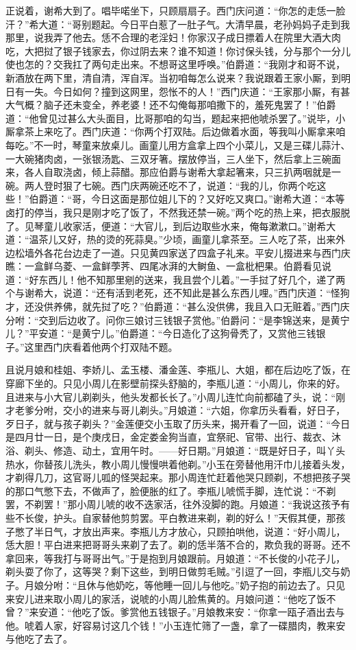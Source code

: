 正说着，谢希大到了。唱毕喏坐下，只顾扇扇子。西门庆问道：“你怎的走恁一脸汗？”希大道：“哥别题起。今日平白惹了一肚子气。大清早晨，老孙妈妈子走到我那里，说我弄了他去。恁不合理的老淫妇！你家汉子成日摽着人在院里大酒大肉吃，大把挝了银子钱家去，你过阴去来？谁不知道！你讨保头钱，分与那个一分儿使也怎的？交我扛了两句走出来。不想哥这里呼唤。”伯爵道：“我刚才和哥不说，新酒放在两下里，清自清，浑自浑。当初咱每怎么说来？我说跟着王家小厮，到明日有一失。今日如何？撞到这网里，怨怅不的人！”西门庆道：“王家那小厮，有甚大气概？脑子还未变全，养老婆！还不勾俺每那咱撒下的，羞死鬼罢了！”伯爵道：“他曾见过甚么大头面目，比哥那咱的勾当，题起来把他唬杀罢了。”说毕，小厮拿茶上来吃了。西门庆道：“你两个打双陆。后边做着水面，等我叫小厮拿来咱每吃。”不一时，琴童来放桌儿。画童儿用方盒拿上四个小菜儿，又是三碟儿蒜汁、一大碗猪肉卤，一张银汤匙、三双牙箸。摆放停当，三人坐下，然后拿上三碗面来，各人自取浇卤，倾上蒜醋。那应伯爵与谢希大拿起箸来，只三扒两咽就是一碗。两人登时狠了七碗。西门庆两碗还吃不了，说道：“我的儿，你两个吃这些！”伯爵道：“哥，今日这面是那位姐儿下的？又好吃又爽口。”谢希大道：“本等卤打的停当，我只是刚才吃了饭了，不然我还禁一碗。”两个吃的热上来，把衣服脱了。见琴童儿收家活，便道：“大官儿，到后边取些水来，俺每漱漱口。”谢希大道：“温茶儿又好，热的烫的死蒜臭。”少顷，画童儿拿茶至。三人吃了茶，出来外边松墙外各花台边走了一道。只见黄四家送了四盒子礼来。平安儿掇进来与西门庆瞧：一盒鲜乌菱、一盒鲜荸荠、四尾冰湃的大鲥鱼、一盒枇杷果。伯爵看见说道：“好东西儿！他不知那里剜的送来，我且尝个儿着。”一手挝了好几个，递了两个与谢希大，说道：“还有活到老死，还不知此是甚么东西儿哩。”西门庆道：“怪狗才，还没供养佛，就先挝了吃？”伯爵道：“甚么没供佛，我且入口无赃着。”西门庆分咐：“交到后边收了。问你三娘讨三钱银子赏他。”伯爵问：“是李锦送来，是黄宁儿？”平安道：“是黄宁儿。”伯爵道：“今日造化了这狗骨秃了，又赏他三钱银子。”这里西门庆看着他两个打双陆不题。

且说月娘和桂姐、李娇儿、孟玉楼、潘金莲、李瓶儿、大姐，都在后边吃了饭，在穿廊下坐的。只见小周儿在影壁前探头舒脑的，李瓶儿道：“小周儿，你来的好。且进来与小大官儿剃剃头，他头发都长长了。”小周儿连忙向前都磕了头，说：“刚才老爹分咐，交小的进来与哥儿剃头。”月娘道：“六姐，你拿历头看看，好日子，歹日子，就与孩子剃头？”金莲便交小玉取了历头来，揭开看了一回，说道：“今日是四月廿一日，是个庚戌日，金定娄金狗当直，宜祭祀、官带、出行、裁衣、沐浴、剃头、修造、动土，宜用午时。——好日期。”月娘道：“既是好日子，叫丫头热水，你替孩儿洗头，教小周儿慢慢哄着他剃。”小玉在旁替他用汗巾儿接着头发，才剃得几刀，这官哥儿呱的怪哭起来。那小周连忙赶着他哭只顾剃，不想把孩子哭的那口气憋下去，不做声了，脸便胀的红了。李瓶儿唬慌手脚，连忙说：“不剃罢，不剃罢！”那小周儿唬的收不迭家活，往外没脚的跑。月娘道：“我说这孩予有些不长俊，护头。自家替他剪剪罢。平白教进来剃，剃的好么！”天假其便，那孩子憋了半日气，才放出声来。李瓶儿方才放心，只顾拍哄他，说道：“好小周儿，恁大胆！平白进来把哥哥头来剃了去了。剃的恁半落不合的，欺负我的哥哥。还不拿回来，等我打与哥哥出气。”于是抱到月娘跟前。月娘道：“不长俊的小花子儿，剃头耍了你了，这等哭？剩下这些，到明日做剪毛贼。”引逗了一回，李瓶儿交与奶子。月娘分咐：“且休与他奶吃，等他睡一回儿与他吃。”奶子抱的前边去了。只见来安儿进来取小周儿的家活，说唬的小周儿脸焦黄的。月娘问道：“他吃了饭不曾？”来安道：“他吃了饭。爹赏他五钱银子。”月娘教来安：“你拿一瓯子酒出去与他。唬着人家，好容易讨这几个钱！”小玉连忙筛了一盏，拿了一碟腊肉，教来安与他吃了去了。

